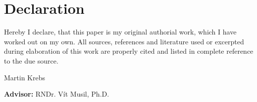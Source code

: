 \chapter*{Declaration}

\noindent
Hereby I declare, that this paper is my original authorial work, which I
have worked out on my own. All sources, references and literature used or
excerpted during elaboration of this work are properly cited and listed in
complete reference to the due source.

\vspace{1cm}
\begin{flushright}
    Martin Krebs
\end{flushright}
\vfill
\textbf{Advisor:} RNDr. Vít Musil, Ph.D.
